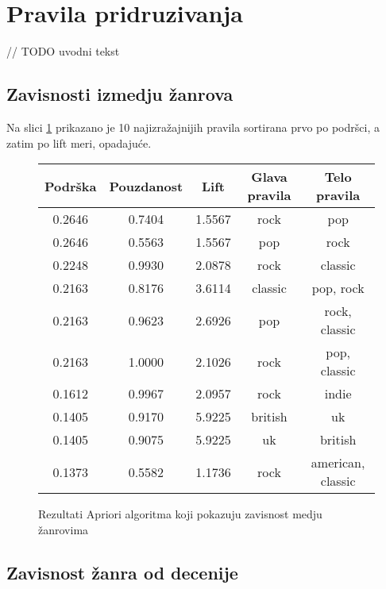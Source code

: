 \section{Pravila pridruzivanja}
\label{sec:PravilaPridruzivanja}

// TODO uvodni tekst


\subsection{Zavisnosti izmedju \v{z}anrova}
\label{subsec:AprioriZavisnostZanrova}

Na slici \ref{fig:aprioriZanrovi} prikazano je 10 najizra\v{z}ajnijih pravila sortirana prvo po podr\v{s}ci, a zatim po lift meri, opadaju\'c{}e.

\begin{figure}[H]
    \footnotesize
    \centering
    \begin{tabular}{|c|c|c|c|c|}
        \hline
        Podr\v{s}ka & Pouzdanost & Lift & Glava pravila  & Telo pravila \\
        \hline
        0.2646 & 0.7404 & 1.5567 & rock & pop \\
        0.2646 & 0.5563 & 1.5567 & pop & rock \\
        0.2248 & 0.9930 & 2.0878 & rock & classic \\
        0.2163 & 0.8176 & 3.6114 & classic & pop, rock \\
        0.2163 & 0.9623 & 2.6926 & pop & rock, classic \\
        0.2163 & 1.0000 & 2.1026 & rock & pop, classic \\
        0.1612 & 0.9967 & 2.0957 & rock & indie \\
        0.1405 & 0.9170 & 5.9225 & british & uk \\
        0.1405 & 0.9075 & 5.9225 & uk & british \\
        0.1373 & 0.5582 & 1.1736 & rock & american, classic \\
        \hline
    \end{tabular}
    \caption{Rezultati Apriori algoritma koji pokazuju zavisnost medju \v{z}anrovima}
    \label{fig:aprioriZanrovi}
\end{figure}


\subsection{Zavisnost \v{z}anra od decenije}
\label{subsec:AprioriZavisnostZanraOdDecenije}

